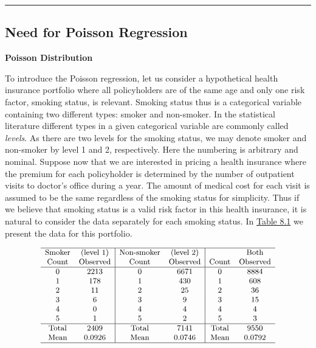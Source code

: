 \documentclass[]{book}
\theoremstyle{definition}
\theoremstyle{definition}
\theoremstyle{definition}
\theoremstyle{remark}
\begin{document}
\begin{center}\rule{0.5\linewidth}{\linethickness}\end{center}

\subsection{Need for Poisson Regression}\label{S:RC:Need.Poi.reg}

\textbf{Poisson Distribution}

To introduce the Poisson regression, let us consider a hypothetical
health insurance portfolio where all policyholders are of the same age
and only one risk factor, smoking status, is relevant. Smoking status
thus is a categorical variable containing two different types: smoker
and non-smoker. In the statistical literature different types in a given
categorical variable are commonly called \emph{levels}. As there are two
levels for the smoking status, we may denote smoker and non-smoker by
level 1 and 2, respectively. Here the numbering is arbitrary and
nominal. Suppose now that we are interested in pricing a health
insurance where the premium for each policyholder is determined by the
number of outpatient visits to doctor's office during a year. The amount
of medical cost for each visit is assumed to be the same regardless of
the smoking status for simplicity. Thus if we believe that smoking
status is a valid risk factor in this health insurance, it is natural to
consider the data separately for each smoking status. In
\protect\hyperlink{tab:8.1}{Table 8.1} we present the data for this
portfolio.

\[
{\small
\begin{matrix}
\begin{array}{cc|cc|cc}
\hline
\text{Smoker} & \text{(level 1)}  & \text{Non-smoker}&\text{(level 2)}  & & \text{Both}\\
  \text{Count} & \text{Observed} &  \text{Count} & \text{Observed}  &   \text{Count} & \text{Observed} \\ \hline
0 & 2213 &   0 & 6671 &  0 & 8884 \\
1 & 178  &   1 & 430  &  1 & 608 \\
2 & 11   &   2 & 25   &  2 & 36 \\
3 & 6    &   3 & 9    &  3 & 15 \\
4 & 0    &   4 & 4    &  4 & 4 \\
5 & 1    &   5 & 2    &  5 & 3 \\ \hline
\text{Total} & 2409  &   \text{Total} & 7141 & \text{Total} & 9550 \\
\text{Mean} & 0.0926 &   \text{Mean} & 0.0746 & \text{Mean} & 0.0792 \\
\hline
    \end{array}
\end{matrix}
}
\]
\end{document}
